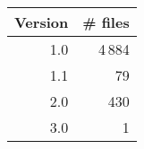 \begin{tabular}{|r|r|}
\hline
\bf Version&\bf \# files\\
\hline
1.0&4\,884\\
\hline
1.1&79\\
\hline
2.0&430\\
\hline
3.0&1\\
\hline
\end{tabular}
